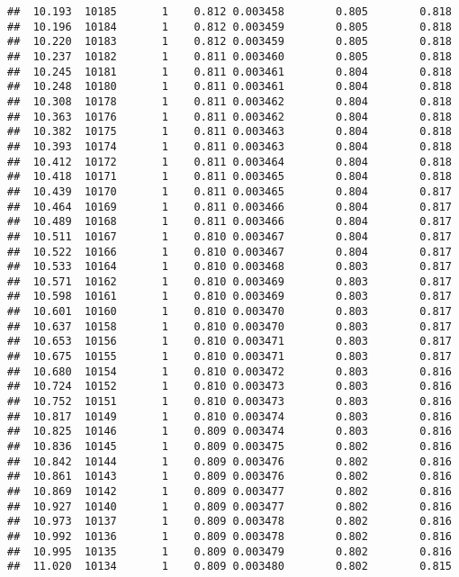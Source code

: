 \documentclass[
]{book}
\begin{document}
\begin{verbatim}
##  10.193  10185       1    0.812 0.003458        0.805        0.818
##  10.196  10184       1    0.812 0.003459        0.805        0.818
##  10.220  10183       1    0.812 0.003459        0.805        0.818
##  10.237  10182       1    0.811 0.003460        0.805        0.818
##  10.245  10181       1    0.811 0.003461        0.804        0.818
##  10.248  10180       1    0.811 0.003461        0.804        0.818
##  10.308  10178       1    0.811 0.003462        0.804        0.818
##  10.363  10176       1    0.811 0.003462        0.804        0.818
##  10.382  10175       1    0.811 0.003463        0.804        0.818
##  10.393  10174       1    0.811 0.003463        0.804        0.818
##  10.412  10172       1    0.811 0.003464        0.804        0.818
##  10.418  10171       1    0.811 0.003465        0.804        0.818
##  10.439  10170       1    0.811 0.003465        0.804        0.817
##  10.464  10169       1    0.811 0.003466        0.804        0.817
##  10.489  10168       1    0.811 0.003466        0.804        0.817
##  10.511  10167       1    0.810 0.003467        0.804        0.817
##  10.522  10166       1    0.810 0.003467        0.804        0.817
##  10.533  10164       1    0.810 0.003468        0.803        0.817
##  10.571  10162       1    0.810 0.003469        0.803        0.817
##  10.598  10161       1    0.810 0.003469        0.803        0.817
##  10.601  10160       1    0.810 0.003470        0.803        0.817
##  10.637  10158       1    0.810 0.003470        0.803        0.817
##  10.653  10156       1    0.810 0.003471        0.803        0.817
##  10.675  10155       1    0.810 0.003471        0.803        0.817
##  10.680  10154       1    0.810 0.003472        0.803        0.816
##  10.724  10152       1    0.810 0.003473        0.803        0.816
##  10.752  10151       1    0.810 0.003473        0.803        0.816
##  10.817  10149       1    0.810 0.003474        0.803        0.816
##  10.825  10146       1    0.809 0.003474        0.803        0.816
##  10.836  10145       1    0.809 0.003475        0.802        0.816
##  10.842  10144       1    0.809 0.003476        0.802        0.816
##  10.861  10143       1    0.809 0.003476        0.802        0.816
##  10.869  10142       1    0.809 0.003477        0.802        0.816
##  10.927  10140       1    0.809 0.003477        0.802        0.816
##  10.973  10137       1    0.809 0.003478        0.802        0.816
##  10.992  10136       1    0.809 0.003478        0.802        0.816
##  10.995  10135       1    0.809 0.003479        0.802        0.816
##  11.020  10134       1    0.809 0.003480        0.802        0.815

\end{verbatim}
\end{document}
